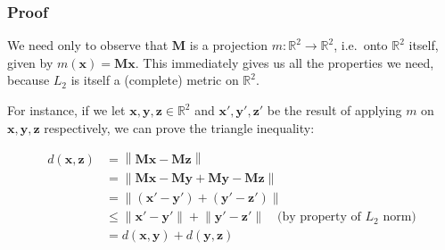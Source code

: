 \documentclass{article}
\newcommand{\vect}[1]{\ensuremath{\boldsymbol{\mathbf{#1}}}\xspace}
\begin{document}
\subsubsection{Proof}

We need only to observe that $\vect{M}$ is a projection $m : \mathbb{R}^2 \rightarrow \mathbb{R}^2$, i.e.\ onto $\mathbb{R}^2$ itself, given by $m(\vect{x}) = \vect{M}\vect{x}$. This immediately gives us all the properties we need, because $L_2$ is itself a (complete) metric on $\mathbb{R}^2$.

For instance, if we let $\vect{x},\vect{y},\vect{z} \in \mathbb{R}^2$ and $\vect{x'},\vect{y'},\vect{z'}$ be the result of applying $m$ on $\vect{x},\vect{y},\vect{z}$ respectively, we can prove the triangle inequality:

\begin{align}
\nonumber d(\vect{x},\vect{z}) &= \left\|\vect{M}\vect{x} - \vect{M}\vect{z}\right\|\\
\nonumber &= \left\|\vect{M}\vect{x} - \vect{M}\vect{y} + \vect{M}\vect{y} - \vect{M}\vect{z}\right\|\\
\nonumber &= \left\|(\vect{x'} - \vect{y'}) + (\vect{y'} - \vect{z'})\right\|\\
\nonumber &\leq \left\|\vect{x'} - \vect{y'}\right\| + \left\|\vect{y'} - \vect{z'}\right\|\quad \text{(by property of } L_2 \text{ norm)}\\
  &= d(\vect{x},\vect{y}) + d(\vect{y},\vect{z})
\end{align}

\end{document}
